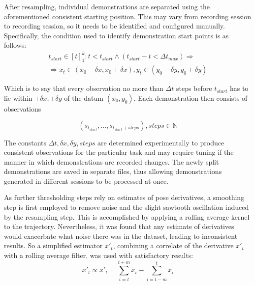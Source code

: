 \documentclass{article}
\begin{document}
After resampling, individual demonstrations are separated using the aforementioned consistent starting position. This may vary from recording session to recording session, so it needs to be identified and configured manually. Specifically, the condition used to identify demonstration start points is as follows:
\begin{align}
	t_{start} \in [t]^k_1: t < t_{start} \land (t_{start} - t < \Delta t_{max}) \Rightarrow \nonumber \\
	\Rightarrow x_t \in (x_{0} - \delta x, x_{0} + \delta x ), y_t \in  (y_{0} - \delta y, y_{0} + \delta y )
\end{align}

Which is to say that every observation no more than $\Delta t$ steps before $t_{start}$ has to lie within $\pm \delta x, \pm \delta y$ of the datum $(x_0, y_0)$. Each demonstration then consists of observations 

\begin{equation}
	(s_{t_{start}}, ... , s_{t_{start}+steps}), steps \in \mathbb{N}
\end{equation}
	
The constants $\Delta t, \delta x, \delta y, steps$ are determined experimentally to produce consistent observations for the particular task and may require tuning if the manner in which demonstrations are recorded changes. The newly split demonstrations are saved in separate files, thus allowing demonstrations generated in different sessions to be processed at once.

As further thresholding steps rely on estimates of pose derivatives, a smoothing step is first employed to remove noise and the slight sawtooth oscillation induced by the resampling step. This is accomplished by applying a rolling average kernel to the trajectory. Nevertheless, it was found that any estimate of derivatives would exacerbate what noise there was in the dataset, leading to inconsistent results. So a simplified estimator $\overline{x'_t}$, combining a correlate of the derivative $x'_t$ with a rolling average filter, was used with satisfactory results:
\begin{equation}
    x'_t \propto \overline{x'_t} = \sum_{i=t}^{t+m}  x_i - \sum_{i=t-m}^{t}  x_i
\end{equation}
\end{document}
